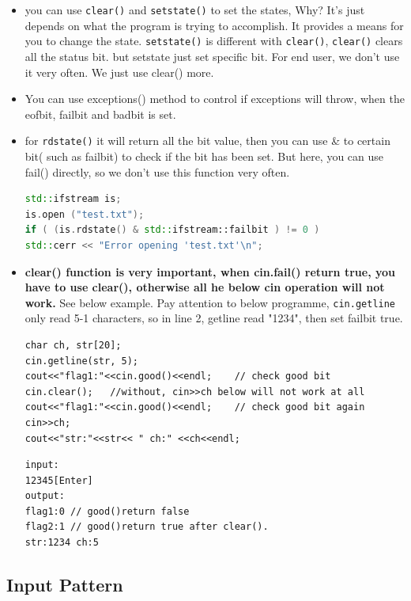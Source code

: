 \documentclass[a4paper,11pt,twoside]{book}
\begin{document}
\begin{itemize}
	
	\item you can use \texttt{clear()} and \texttt{setstate()} to set the states, Why? It's just depends on what the program is trying to accomplish.  It provides a means for you to change the state. \texttt{setstate()} is different with \texttt{clear()}, \texttt{clear()} clears all the status bit. but setstate just set specific bit. For end user, we don't use it very often. We just use clear() more.

	\item You can use exceptions() method to control if exceptions will throw, when the eofbit, failbit and badbit is set.
	
	\item for \texttt{rdstate()} it will return all the bit value, then you can use \& to certain bit( such as failbit) to check if the bit has been set. But here, you can use fail() directly, so we don't use this function very often.
\begin{lstlisting}[frame=single, language=c++]
std::ifstream is;
is.open ("test.txt");
if ( (is.rdstate() & std::ifstream::failbit ) != 0 )
std::cerr << "Error opening 'test.txt'\n";
\end{lstlisting}
	
	
	\item \textbf{clear() function is very important, when cin.fail() return true, you have to use clear(), otherwise all he below cin operation will not work.} See below example. Pay attention to below programme, \texttt{cin.getline} only read 5-1 characters, so in line 2, getline read "1234", then set failbit true.
	
\begin{lstlisting}[]
char ch, str[20];
cin.getline(str, 5);
cout<<"flag1:"<<cin.good()<<endl;    // check good bit
cin.clear();   //without, cin>>ch below will not work at all
cout<<"flag1:"<<cin.good()<<endl;    // check good bit again
cin>>ch;
cout<<"str:"<<str<< " ch:" <<ch<<endl;
\end{lstlisting}

\begin{verbatim}
input:
12345[Enter]
output:
flag1:0 // good()return false
flag2:1 // good()return true after clear().
str:1234 ch:5
\end{verbatim}
	
\end{itemize}

\subsection{Input Pattern}
\end{document}
